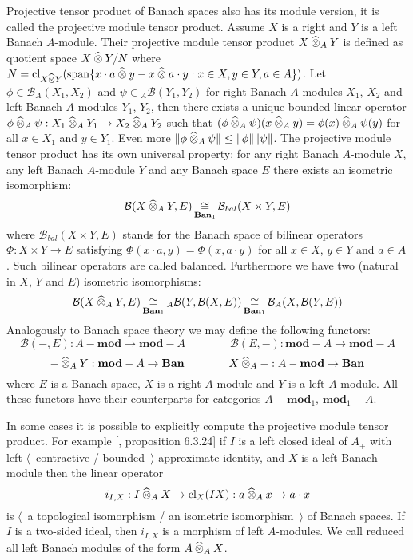 Projective tensor product of Banach spaces also has its module version, it is
called the projective module tensor product. Assume $X$ is a right and $Y$ is a
left Banach $A$-module. Their projective module tensor product
$X\mathbin{\widehat{\otimes}}_{A}Y$ is defined as quotient space $X\mathbin{\widehat{\otimes}} Y / N$ where
$N
=\operatorname{cl}_{X\mathbin{\widehat{\otimes}} Y}(\operatorname{span} \{
  x\cdot a\mathbin{\widehat{\otimes}} y-x\mathbin{\widehat{\otimes}} a\cdot y
  :x\in X,y\in Y,a\in A
 \})$. 
Let $\phi\in\mathcal{B}_A(X_1,X_2)$ and $\psi\in{}_A\mathcal{B}(Y_1,Y_2)$ 
for right Banach $A$-modules $X_1$, $X_2$ and left 
Banach $A$-modules $Y_1$, $Y_2$, then there exists a unique bounded 
linear operator 
$\phi\mathbin{\widehat{\otimes}}_{A} \psi:X_1\mathbin{\widehat{\otimes}}_{A} Y_1\to X_2\mathbin{\widehat{\otimes}}_{A} Y_2$ 
such that
$(\phi\mathbin{\widehat{\otimes}}_{A} \psi)(x\mathbin{\widehat{\otimes}}_{A} y)=\phi(x)\mathbin{\widehat{\otimes}}_{A} \psi(y)$
for all $x\in X_1$ and $y\in Y_1$. Even more 
$\Vert \phi\mathbin{\widehat{\otimes}}_{A} \psi\Vert\leq\Vert \phi\Vert\Vert \psi\Vert$. 
The projective module tensor product has its own universal property: for any
right Banach $A$-module $X$, any left Banach $A$-module $Y$ and any Banach space
$E$ there exists an isometric isomorphism:
$$
\mathcal{B}(X\mathbin{\widehat{\otimes}}_{A}Y,E)
\mathop{\mathbin{\cong}}\limits_{\mathbf{Ban}_1}
\mathcal{B}_{bal}(X\times Y, E)
$$
where $\mathcal{B}_{bal}(X\times Y, E)$ stands for the Banach space of bilinear
operators $\Phi:X\times Y\to E$ satisfying $\Phi(x\cdot a,y)=\Phi(x,a\cdot y)$
for all $x\in X$, $y\in Y$ and $a\in A$. Such bilinear operators are called
balanced. Furthermore we have two (natural in $X$, $Y$ and $E$) isometric
isomorphisms:
$$
\mathcal{B}(X\mathbin{\widehat{\otimes}}_{A}Y,E)
\mathop{\mathbin{\cong}}\limits_{\mathbf{Ban}_1}
{}_A\mathcal{B}(Y,\mathcal{B}(X,E))
\mathop{\mathbin{\cong}}\limits_{\mathbf{Ban}_1}
\mathcal{B}_A(X,\mathcal{B}(Y,E))
$$
Analogously to Banach space theory we may define the following functors:
$$
\mathcal{B}(-,E):A-\mathbf{mod}\to \mathbf{mod}-A
\qquad\qquad
\mathcal{B}(E,-):\mathbf{mod}-A\to \mathbf{mod}-A
$$
$$
-\mathbin{\widehat{\otimes}}_{A} Y:\mathbf{mod}-A\to\mathbf{Ban}
\qquad\qquad
X\mathbin{\widehat{\otimes}}_{A} -:A-\mathbf{mod}\to\mathbf{Ban}
$$
where $E$ is a Banach space, $X$ is a right $A$-module and $Y$ is a left
$A$-module. All these functors have their counterparts for categories
$A-\mathbf{mod}_1$, $\mathbf{mod}_1-A$. 

In some cases it is possible to explicitly compute the projective module tensor
product. For example [\cite{HelBanLocConvAlg}, proposition 6.3.24] if $I$ is a
left closed ideal of $A_+$ with left $\langle$~contractive / bounded~$\rangle$
approximate identity, and $X$ is a left Banach module then the linear operator 
$$
i_{I,X}
:I\mathbin{\widehat{\otimes}}_{A}X \to \operatorname{cl}_X(IX)
:a\mathbin{\widehat{\otimes}}_{A} x\mapsto a\cdot x
$$
is $\langle$~a topological isomorphism / an isometric isomorphism~$\rangle$ of
Banach spaces. If $I$ is a two-sided ideal, then $i_{I,X}$ is a morphism of left
$A$-modules. We call reduced all left Banach modules of the form
$A\mathbin{\widehat{\otimes}}_{A}X$. 

